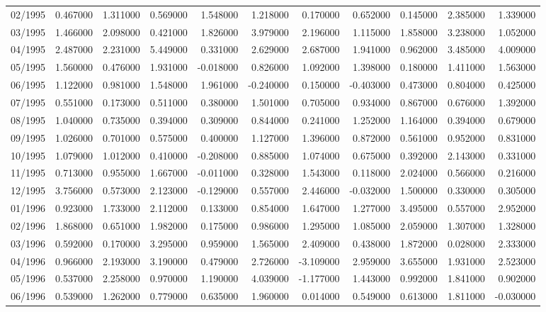 \begin{tabular}{lrrrrrrrrrr}
02/1995 & 0.467000 & 1.311000 & 0.569000 & 1.548000 & 1.218000 & 0.170000 & 0.652000 & 0.145000 & 2.385000 & 1.339000 \\
03/1995 & 1.466000 & 2.098000 & 0.421000 & 1.826000 & 3.979000 & 2.196000 & 1.115000 & 1.858000 & 3.238000 & 1.052000 \\
04/1995 & 2.487000 & 2.231000 & 5.449000 & 0.331000 & 2.629000 & 2.687000 & 1.941000 & 0.962000 & 3.485000 & 4.009000 \\
05/1995 & 1.560000 & 0.476000 & 1.931000 & -0.018000 & 0.826000 & 1.092000 & 1.398000 & 0.180000 & 1.411000 & 1.563000 \\
06/1995 & 1.122000 & 0.981000 & 1.548000 & 1.961000 & -0.240000 & 0.150000 & -0.403000 & 0.473000 & 0.804000 & 0.425000 \\
07/1995 & 0.551000 & 0.173000 & 0.511000 & 0.380000 & 1.501000 & 0.705000 & 0.934000 & 0.867000 & 0.676000 & 1.392000 \\
08/1995 & 1.040000 & 0.735000 & 0.394000 & 0.309000 & 0.844000 & 0.241000 & 1.252000 & 1.164000 & 0.394000 & 0.679000 \\
09/1995 & 1.026000 & 0.701000 & 0.575000 & 0.400000 & 1.127000 & 1.396000 & 0.872000 & 0.561000 & 0.952000 & 0.831000 \\
10/1995 & 1.079000 & 1.012000 & 0.410000 & -0.208000 & 0.885000 & 1.074000 & 0.675000 & 0.392000 & 2.143000 & 0.331000 \\
11/1995 & 0.713000 & 0.955000 & 1.667000 & -0.011000 & 0.328000 & 1.543000 & 0.118000 & 2.024000 & 0.566000 & 0.216000 \\
12/1995 & 3.756000 & 0.573000 & 2.123000 & -0.129000 & 0.557000 & 2.446000 & -0.032000 & 1.500000 & 0.330000 & 0.305000 \\
01/1996 & 0.923000 & 1.733000 & 2.112000 & 0.133000 & 0.854000 & 1.647000 & 1.277000 & 3.495000 & 0.557000 & 2.952000 \\
02/1996 & 1.868000 & 0.651000 & 1.982000 & 0.175000 & 0.986000 & 1.295000 & 1.085000 & 2.059000 & 1.307000 & 1.328000 \\
03/1996 & 0.592000 & 0.170000 & 3.295000 & 0.959000 & 1.565000 & 2.409000 & 0.438000 & 1.872000 & 0.028000 & 2.333000 \\
04/1996 & 0.966000 & 2.193000 & 3.190000 & 0.479000 & 2.726000 & -3.109000 & 2.959000 & 3.655000 & 1.931000 & 2.523000 \\
05/1996 & 0.537000 & 2.258000 & 0.970000 & 1.190000 & 4.039000 & -1.177000 & 1.443000 & 0.992000 & 1.841000 & 0.902000 \\
06/1996 & 0.539000 & 1.262000 & 0.779000 & 0.635000 & 1.960000 & 0.014000 & 0.549000 & 0.613000 & 1.811000 & -0.030000 \\

\end{tabular}
